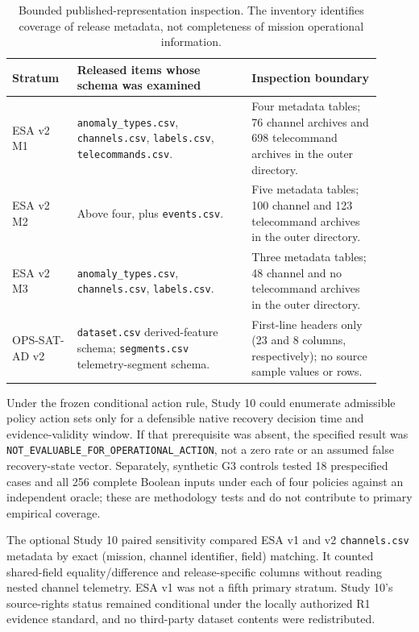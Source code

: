 \documentclass[preprint,12pt]{elsarticle}
\begin{document}
\begin{table}[H]
\centering
\small
\caption{Bounded published-representation inspection. The inventory identifies coverage of release metadata, not completeness of mission operational information.}
\label{tab:stud10scope}
\setlength{\tabcolsep}{2pt}
\begin{tabular}{>{\raggedright\arraybackslash}p{0.16\linewidth}>{\raggedright\arraybackslash}p{0.43\linewidth}>{\raggedright\arraybackslash}p{0.32\linewidth}}
\toprule
Stratum & Released items whose schema was examined & Inspection boundary \\
\midrule
ESA v2 M1 & \texttt{anomaly\_types.csv}, \texttt{channels.csv}, \texttt{labels.csv}, \texttt{telecommands.csv}. & Four metadata tables; 76 channel archives and 698 telecommand archives in the outer directory. \\
ESA v2 M2 & Above four, plus \texttt{events.csv}. & Five metadata tables; 100 channel and 123 telecommand archives in the outer directory. \\
ESA v2 M3 & \texttt{anomaly\_types.csv}, \texttt{channels.csv}, \texttt{labels.csv}. & Three metadata tables; 48 channel and no telecommand archives in the outer directory. \\
OPS-SAT-AD v2 & \texttt{dataset.csv} derived-feature schema; \texttt{segments.csv} telemetry-segment schema. & First-line headers only (23 and 8 columns, respectively); no source sample values or rows. \\
\bottomrule
\end{tabular}
\end{table}

Under the frozen conditional action rule, Study 10 could enumerate admissible policy action sets only for a defensible native recovery decision time and evidence-validity window. If that prerequisite was absent, the specified result was \texttt{NOT\_EVALUABLE\_FOR\_OPERATIONAL\_ACTION}, not a zero rate or an assumed false recovery-state vector. Separately, synthetic G3 controls tested 18 prespecified cases and all 256 complete Boolean inputs under each of four policies against an independent oracle; these are methodology tests and do not contribute to primary empirical coverage.

The optional Study 10 paired sensitivity compared ESA v1 \cite{esaad2024v1} and v2 \cite{esaad2025v2} \texttt{channels.csv} metadata by exact (mission, channel identifier, field) matching. It counted shared-field equality/difference and release-specific columns without reading nested channel telemetry. ESA v1 was not a fifth primary stratum. Study 10's source-rights status remained conditional under the locally authorized R1 evidence standard, and no third-party dataset contents were redistributed.
\end{document}
